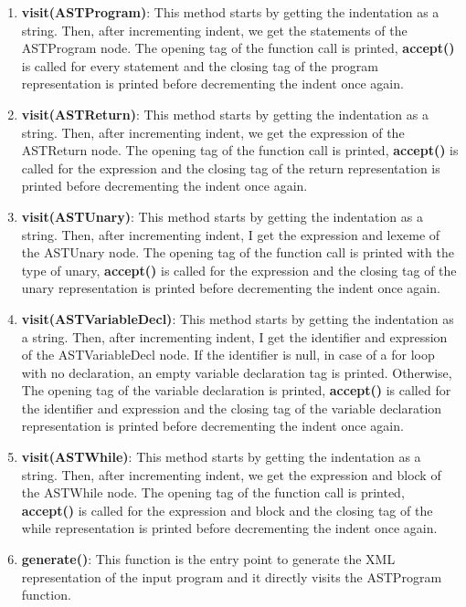 \documentclass{article}
\begin{document}
\begin{enumerate}
					\item \textbf{visit(ASTProgram)}: This method starts by getting the indentation as a string. Then, after incrementing indent, we get the statements of the ASTProgram node. The opening tag of the function call is printed, \textbf{accept()} is called for every statement and the closing tag of the program representation is printed before decrementing the indent once again.		
					
					\item \textbf{visit(ASTReturn)}: This method starts by getting the indentation as a string. Then, after incrementing indent, we get the expression of the ASTReturn node. The opening tag of the function call is printed, \textbf{accept()} is called for the expression and the closing tag of the return representation is printed before decrementing the indent once again.
			
					\item \textbf{visit(ASTUnary)}: This method starts by getting the indentation as a string. Then, after incrementing indent, I get the expression and lexeme of the ASTUnary node. The opening tag of the function call is printed with the type of unary, \textbf{accept()} is called for the expression and the closing tag of the unary representation is printed before decrementing the indent once again.
	
					\item \textbf{visit(ASTVariableDecl)}: This method starts by getting the indentation as a string. Then, after incrementing indent, I get the identifier and expression of the ASTVariableDecl node. If the identifier is null, in case of a for loop with no declaration, an empty variable declaration tag is printed. Otherwise, The opening tag of the variable declaration is printed, \textbf{accept()} is called for the identifier and expression and the closing tag of the variable declaration representation is printed before decrementing the indent once again.
					
						\item \textbf{visit(ASTWhile)}: This method starts by getting the indentation as a string. Then, after incrementing indent, we get the expression and block of the ASTWhile node. The opening tag of the function call is printed, \textbf{accept()} is called for the expression and block and the closing tag of the while representation is printed before decrementing the indent once again.
						
						\item \textbf{generate()}: This function is the entry point to generate the XML representation of the input program and it directly visits the ASTProgram function.
					
						
				\end{enumerate}
				
\end{document}
